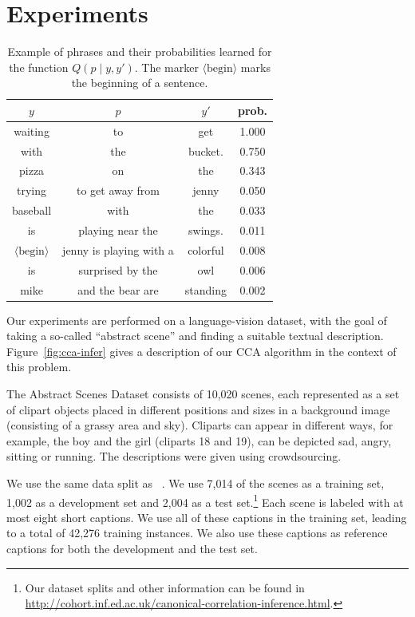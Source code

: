 \documentclass[letterpaper]{article}
\newcommand{\newcite}[1]{\citeauthor{#1}~\shortcite{#1}}
\begin{document}
\section{Experiments}
\label{section:experiments}
\begin{table}
{\small
\begin{tabular}{|ccc|c|}
\hline
$y$ & $p$ & $y'$ & prob. \\
\hline
waiting & to & get & 1.000 \\
with & the & bucket. & 0.750 \\
pizza & on & the & 0.343 \\
trying & to get away from & jenny & 0.050 \\
baseball & with & the & 0.033 \\
is & playing near the & swings. & 0.011 \\
$\langle \mathrm{begin} \rangle$ & jenny is playing with a & colorful & 0.008 \\
is & surprised by the & owl & 0.006 \\
mike & and the bear are & standing & 0.002 \\
\hline
\end{tabular}
}
\caption{Example of phrases and their probabilities learned for the function $Q(p \mid y, y')$. The marker $\langle \mathrm{begin} \rangle$ marks the beginning of a sentence. \label{table:phrases}}
\end{table}


Our experiments are performed on a language-vision dataset, with the goal of taking a so-called ``abstract scene'' \cite{zitnick2013bringing}
and finding a suitable textual description. Figure~\ref{fig:cca-infer} gives a description of our CCA algorithm
in the context of this problem.

The Abstract Scenes Dataset consists of 10,020 scenes, each represented as a set of clipart objects placed in different
positions and sizes in a background image (consisting of a grassy area and sky).
Cliparts can appear in different ways, for example, the boy and the girl (cliparts 18 and 19), can be depicted 
sad, angry, sitting or running. The descriptions were given using crowdsourcing.

We use the same data split as \newcite{ortiz2015learning}. We use 7,014 of the scenes as a training set, 1,002 as a development
set and 2,004 as a test set.\footnote{Our dataset splits and other information can be found in \url{http://cohort.inf.ed.ac.uk/canonical-correlation-inference.html}.}
Each scene is labeled with at most eight short captions. We use all of these captions in the training set, leading to a total
of 42,276 training instances. We also use these captions as reference captions for both the development and the test set.
\end{document}
